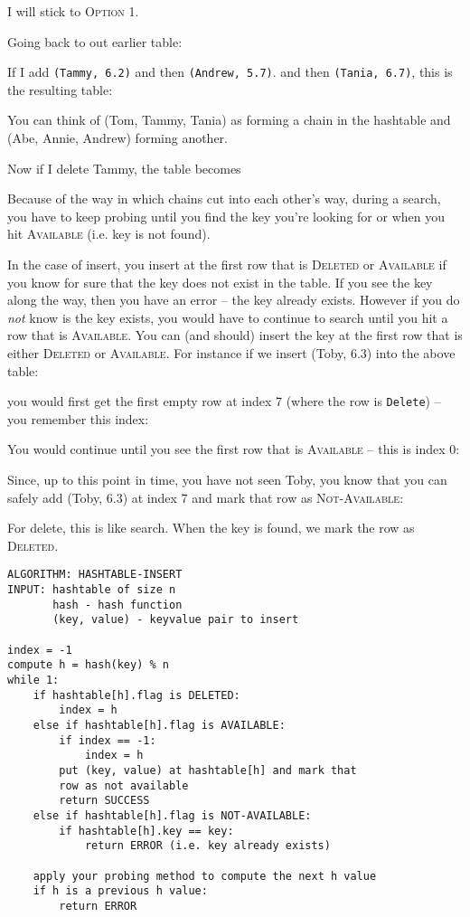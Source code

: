 I will stick to \textsc{Option 1}.

Going back to out earlier table:


If I add 
\texttt{(Tammy, 6.2)}
and
then 
\texttt{(Andrew, 5.7)}.
and
then 
\texttt{(Tania, 6.7)},
this is the resulting table:



You can think of (Tom, Tammy, Tania) as forming a chain in the
hashtable and
(Abe, Annie, Andrew) forming another.

Now if I delete Tammy, the table becomes


Because of the way in which chains cut into each other's way,
during a search, you have to keep probing until you find the key you're
looking for or when you hit \textsc{Available} (i.e. key is not found).

In the case of insert, you insert at the first row that is
\textsc{Deleted}
or
\textsc{Available}
if you know for sure that the key does not exist in the table.
If you see the key along the way, then you have an error -- the
key already exists.
However if you do \textit{not} know is the key exists,
you would have to continue to search until you hit a
row that is \textsc{Available}.
You can (and should) insert the key at the first row that is
either \textsc{Deleted} or \textsc{Available}.
For instance if we insert (Toby, 6.3) into the above table:

you would first get the first empty row at index 7 (where
the row is \texttt{Delete}) -- you remember this index:


You would continue until you see the first row that is \textsc{Available}
-- this is index 0:


Since, up to this point in time, you have not seen Toby, you know
that you can safely add (Toby, 6.3) at index 7 and mark that row
as \textsc{Not-Available}:


For delete, this is like search.
When the key is found, we mark the row as \textsc{Deleted}.



\begin{Verbatim}[frame=single]
ALGORITHM: HASHTABLE-INSERT
INPUT: hashtable of size n
       hash - hash function
       (key, value) - keyvalue pair to insert

index = -1
compute h = hash(key) % n
while 1:
    if hashtable[h].flag is DELETED:
        index = h
    else if hashtable[h].flag is AVAILABLE:
        if index == -1:
            index = h
        put (key, value) at hashtable[h] and mark that
        row as not available
        return SUCCESS
    else if hashtable[h].flag is NOT-AVAILABLE:
        if hashtable[h].key == key:
            return ERROR (i.e. key already exists)
    
    apply your probing method to compute the next h value
    if h is a previous h value:
        return ERROR
\end{Verbatim}


